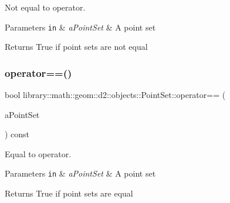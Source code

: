 Not equal to operator. 


\begin{DoxyParams}[1]{Parameters}
\mbox{\tt in}  & {\em a\+Point\+Set} & A point set \\
\hline
\end{DoxyParams}
\begin{DoxyReturn}{Returns}
True if point sets are not equal 
\end{DoxyReturn}
\mbox{\label{classlibrary_1_1math_1_1geom_1_1d2_1_1objects_1_1_point_set_a0e0187a6f35dadf000b69615b9b82cde}} 
\subsubsection{\texorpdfstring{operator==()}{operator==()}}
{\footnotesize\ttfamily bool library\+::math\+::geom\+::d2\+::objects\+::\+Point\+Set\+::operator== (\begin{DoxyParamCaption}\item[{const \hyperlink{classlibrary_1_1math_1_1geom_1_1d2_1_1objects_1_1_point_set}{Point\+Set} \&}]{a\+Point\+Set }\end{DoxyParamCaption}) const}



Equal to operator. 


\begin{DoxyParams}[1]{Parameters}
\mbox{\tt in}  & {\em a\+Point\+Set} & A point set \\
\hline
\end{DoxyParams}
\begin{DoxyReturn}{Returns}
True if point sets are equal 
\end{DoxyReturn}
\mbox{\label{classlibrary_1_1math_1_1geom_1_1d2_1_1objects_1_1_point_set_a652098938854c19294b5df8e8634cc9a}} 
